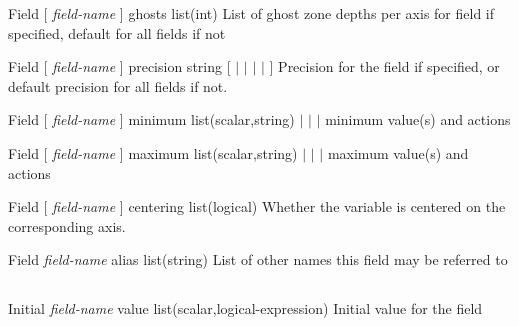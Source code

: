 \documentclass{article}
\begin{document}
\Parameter
{Field}
{[ \textit{field-name} ]} 
{ghosts}
{list(int)}
{}
{List of ghost zone depths per axis for field if specified, default for all fields if not}
{}
{}

\Parameter
{Field} 
{[ \textit{field-name} ]} 
{precision} 
{string} 
{[   
$|$  
$|$ 
$|$ 
$|$  ] } 
{Precision for the field if specified, or default precision for all fields if not.} 
{} 
{}

\Parameter
{Field}
{[ \textit{field-name} ]} 
{minimum}
{list(scalar,string)}
{ $|$  $|$  $|$ }
{minimum value(s) and actions }
{}
{}

\Parameter
{Field}
{[ \textit{field-name} ]} 
{maximum}
{list(scalar,string)}
{ $|$  $|$  $|$ }
{maximum value(s) and actions }
{}
{}

\Parameter
{Field}
{[ \textit{field-name} ]} 
{centering}
{list(logical)}
{}
{Whether the variable is centered on the corresponding axis.}
{}
{}

\Parameter
{Field}
{\textit{field-name}}
{alias}
{list(string)}
{}
{List of other names this field may be referred to}
{}
{}

\subsection{}

\Parameter
{Initial}
{\textit{field-name}}
{value}
{list(scalar,logical-expression)}
{}
{Initial value for the field}
{}
{}
\end{document}
